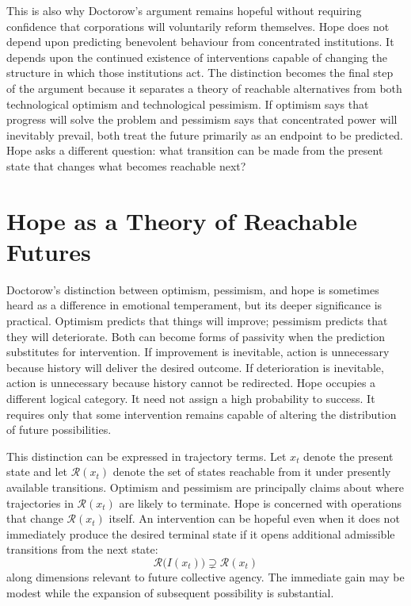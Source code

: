\documentclass[11pt]{article}
\begin{document}
This is also why Doctorow's argument remains hopeful without requiring confidence that corporations will voluntarily reform themselves. Hope does not depend upon predicting benevolent behaviour from concentrated institutions. It depends upon the continued existence of interventions capable of changing the structure in which those institutions act. The distinction becomes the final step of the argument because it separates a theory of reachable alternatives from both technological optimism and technological pessimism. If optimism says that progress will solve the problem and pessimism says that concentrated power will inevitably prevail, both treat the future primarily as an endpoint to be predicted. Hope asks a different question: what transition can be made from the present state that changes what becomes reachable next?

\section{Hope as a Theory of Reachable Futures}

Doctorow's distinction between optimism, pessimism, and hope is sometimes heard as a difference in emotional temperament, but its deeper significance is practical. Optimism predicts that things will improve; pessimism predicts that they will deteriorate. Both can become forms of passivity when the prediction substitutes for intervention. If improvement is inevitable, action is unnecessary because history will deliver the desired outcome. If deterioration is inevitable, action is unnecessary because history cannot be redirected. Hope occupies a different logical category. It need not assign a high probability to success. It requires only that some intervention remains capable of altering the distribution of future possibilities.

This distinction can be expressed in trajectory terms. Let \(x_t\) denote the present state and let \(\mathcal{R}(x_t)\) denote the set of states reachable from it under presently available transitions. Optimism and pessimism are principally claims about where trajectories in \(\mathcal{R}(x_t)\) are likely to terminate. Hope is concerned with operations that change \(\mathcal{R}(x_t)\) itself. An intervention can be hopeful even when it does not immediately produce the desired terminal state if it opens additional admissible transitions from the next state:
\[
\mathcal{R}\bigl(I(x_t)\bigr)
\supsetneq
\mathcal{R}(x_t)
\]
along dimensions relevant to future collective agency. The immediate gain may be modest while the expansion of subsequent possibility is substantial.
\end{document}
